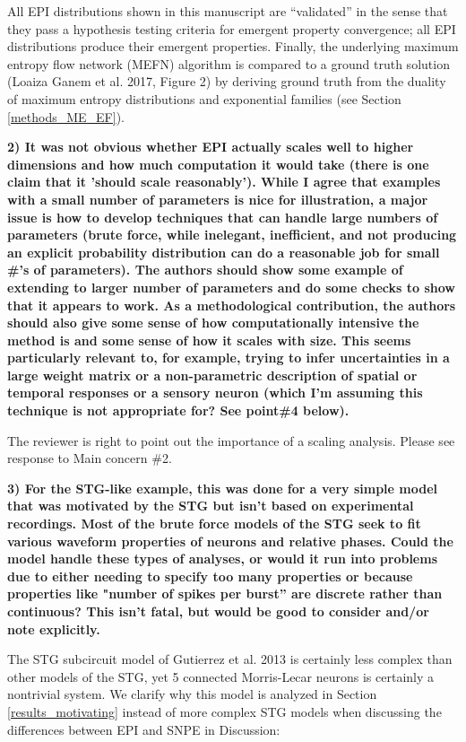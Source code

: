 \documentclass[11pt,a4paper]{article}
\begin{document}
All EPI distributions shown in this manuscript are “validated” in the sense that they pass a hypothesis testing criteria for emergent property convergence; all EPI distributions produce their emergent properties.
Finally, the underlying maximum entropy flow network (MEFN) algorithm is compared to a ground truth solution (Loaiza Ganem et al. 2017, Figure 2) by deriving ground truth from the duality of maximum entropy distributions and exponential families (see Section \ref{methods_ME_EF}).

\textbf{2) It was not obvious whether EPI actually scales well to higher dimensions and how much computation it would take (there is one claim that it 'should scale reasonably'). While I agree that examples with a small number of parameters is nice for illustration, a major issue is how to develop techniques that can handle large numbers of parameters (brute force, while inelegant, inefficient, and not producing an explicit probability distribution can do a reasonable job for small \#'s of parameters). The authors should show some example of extending to larger number of parameters and do some checks to show that it appears to work. As a methodological contribution, the authors should also give some sense of how computationally intensive the method is and some sense of how it scales with size. This seems particularly relevant to, for example, trying to infer uncertainties in a large weight matrix or a non-parametric description of spatial or temporal responses or a sensory neuron (which I'm assuming this technique is not appropriate for? See point\#4 below). }

The reviewer is right to point out the importance of a scaling analysis. Please see response to Main concern \#2.

\textbf{3) For the STG-like example, this was done for a very simple model that was motivated by the STG but isn't based on experimental recordings. Most of the brute force models of the STG seek to fit various waveform properties of neurons and relative phases. Could the model handle these types of analyses, or would it run into problems due to either needing to specify too many properties or because properties like "number of spikes per burst'' are discrete rather than continuous? This isn't fatal, but would be good to consider and/or note explicitly. }

The STG subcircuit model of Gutierrez et al. 2013 is certainly less complex than other models of the STG, yet 5 connected Morris-Lecar neurons is certainly a nontrivial system.
We clarify why this model is analyzed in Section \ref{results_motivating} instead of more complex STG models when discussing the differences between EPI and SNPE in Discussion:
\end{document}
